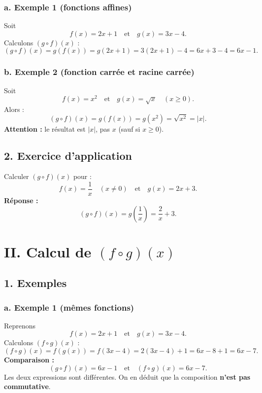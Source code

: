 \documentclass[12pt,a4paper]{article}
\begin{document}
\subsubsection*{\color{myred} a. Exemple 1 (fonctions affines) }
Soit 
\[
f(x) = 2x + 1 \quad \text{et} \quad g(x) = 3x - 4.
\]
Calculons \( (g \circ f)(x) \) :
\[
(g \circ f)(x) = g(f(x)) = g(2x+1) = 3(2x+1) - 4 = 6x + 3 - 4 = 6x - 1.
\]

\subsubsection*{\color{myred} b. Exemple 2 (fonction carrée et racine carrée)}
Soit 
\[
f(x) = x^2 \quad \text{et} \quad g(x) = \sqrt{x} \quad (x \ge 0).
\]
Alors :
\[
(g \circ f)(x) = g(f(x)) = g(x^2) = \sqrt{x^2} = |x|.
\]
\textbf{Attention :} le résultat est \( |x| \), pas \( x \) (sauf si \( x \ge 0 \)).

\subsection*{\color{myred} 2. Exercice d’application }
Calculer \( (g \circ f)(x) \) pour :
\[
f(x) = \frac{1}{x} \quad (x \neq 0) \quad \text{et} \quad g(x) = 2x + 3.
\]
\textbf{Réponse :}
\[
(g \circ f)(x) = g\left(\frac{1}{x}\right) = \frac{2}{x} + 3.
\]

\newpage

\section*{\color{myred} II. Calcul de \( (f \circ g)(x) \) }

\subsection*{\color{myred} 1. Exemples }

\subsubsection*{\color{myred} a. Exemple 1 (mêmes fonctions) }
Reprenons 
\[
f(x) = 2x + 1 \quad \text{et} \quad g(x) = 3x - 4.
\]
Calculons \( (f \circ g)(x) \) :
\[
(f \circ g)(x) = f(g(x)) = f(3x-4) = 2(3x-4) + 1 = 6x - 8 + 1 = 6x - 7.
\]
\textbf{Comparaison :}
\[
(g \circ f)(x) = 6x - 1 \quad \text{et} \quad (f \circ g)(x) = 6x - 7.
\]
Les deux expressions sont différentes. On en déduit que la composition \textbf{n'est pas commutative}.
\end{document}
